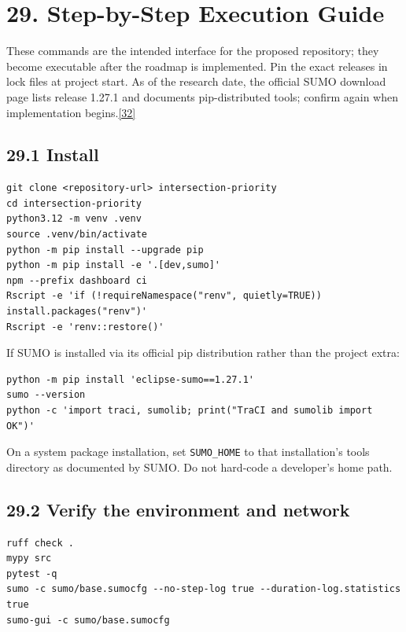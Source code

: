 \documentclass[
  english,
  11pt,
  a4paper,
]{article}
\begin{document}
\section{29. Step-by-Step Execution
Guide}\label{step-by-step-execution-guide}

These commands are the intended interface for the proposed repository;
they become executable after the roadmap is implemented. Pin the exact
releases in lock files at project start. As of the research date, the
official SUMO download page lists release 1.27.1 and documents
pip-distributed tools; confirm again when implementation
begins.\hyperref[source-32]{[32]}

\subsection{29.1 Install}\label{install}

\begin{verbatim}
git clone <repository-url> intersection-priority
cd intersection-priority
python3.12 -m venv .venv
source .venv/bin/activate
python -m pip install --upgrade pip
python -m pip install -e '.[dev,sumo]'
npm --prefix dashboard ci
Rscript -e 'if (!requireNamespace("renv", quietly=TRUE)) install.packages("renv")'
Rscript -e 'renv::restore()'
\end{verbatim}

If SUMO is installed via its official pip distribution rather than the
project extra:

\begin{verbatim}
python -m pip install 'eclipse-sumo==1.27.1'
sumo --version
python -c 'import traci, sumolib; print("TraCI and sumolib import OK")'
\end{verbatim}

On a system package installation, set \texttt{SUMO\_HOME} to that
installation's tools directory as documented by SUMO. Do not hard-code a
developer's home path.

\subsection{29.2 Verify the environment and
network}\label{verify-the-environment-and-network}

\begin{verbatim}
ruff check .
mypy src
pytest -q
sumo -c sumo/base.sumocfg --no-step-log true --duration-log.statistics true
sumo-gui -c sumo/base.sumocfg
\end{verbatim}
\end{document}
